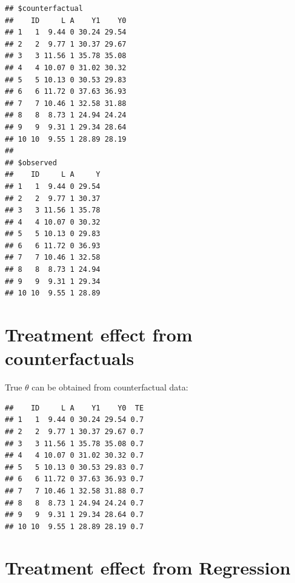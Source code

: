 \documentclass[
]{book}
\newenvironment{Shaded}{\begin{snugshade}}{\end{snugshade}}
\newcommand{\NormalTok}[1]{#1}
\newcommand{\OtherTok}[1]{\textcolor[rgb]{0.56,0.35,0.01}{#1}}
\newcommand{\SpecialCharTok}[1]{\textcolor[rgb]{0.00,0.00,0.00}{#1}}
\begin{document}
\begin{verbatim}
## $counterfactual
##    ID     L A    Y1    Y0
## 1   1  9.44 0 30.24 29.54
## 2   2  9.77 1 30.37 29.67
## 3   3 11.56 1 35.78 35.08
## 4   4 10.07 0 31.02 30.32
## 5   5 10.13 0 30.53 29.83
## 6   6 11.72 0 37.63 36.93
## 7   7 10.46 1 32.58 31.88
## 8   8  8.73 1 24.94 24.24
## 9   9  9.31 1 29.34 28.64
## 10 10  9.55 1 28.89 28.19
## 
## $observed
##    ID     L A     Y
## 1   1  9.44 0 29.54
## 2   2  9.77 1 30.37
## 3   3 11.56 1 35.78
## 4   4 10.07 0 30.32
## 5   5 10.13 0 29.83
## 6   6 11.72 0 36.93
## 7   7 10.46 1 32.58
## 8   8  8.73 1 24.94
## 9   9  9.31 1 29.34
## 10 10  9.55 1 28.89
\end{verbatim}

\hypertarget{treatment-effect-from-counterfactuals}{%
\section{Treatment effect from counterfactuals}\label{treatment-effect-from-counterfactuals}}

True \(\theta\) can be obtained from counterfactual data:

\begin{Shaded}
\end{Shaded}

\begin{verbatim}
##    ID     L A    Y1    Y0  TE
## 1   1  9.44 0 30.24 29.54 0.7
## 2   2  9.77 1 30.37 29.67 0.7
## 3   3 11.56 1 35.78 35.08 0.7
## 4   4 10.07 0 31.02 30.32 0.7
## 5   5 10.13 0 30.53 29.83 0.7
## 6   6 11.72 0 37.63 36.93 0.7
## 7   7 10.46 1 32.58 31.88 0.7
## 8   8  8.73 1 24.94 24.24 0.7
## 9   9  9.31 1 29.34 28.64 0.7
## 10 10  9.55 1 28.89 28.19 0.7
\end{verbatim}

\hypertarget{treatment-effect-from-regression}{%
\section{Treatment effect from Regression}\label{treatment-effect-from-regression}}
\end{document}
